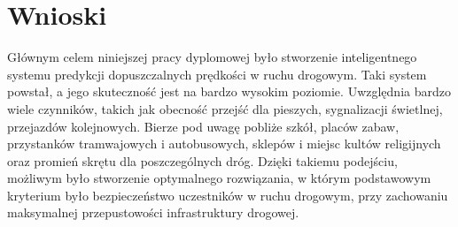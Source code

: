 \chapter{Wnioski}
\label{cha:wnioski}

Głównym celem niniejszej pracy dyplomowej było stworzenie inteligentnego systemu predykcji dopuszczalnych prędkości w ruchu drogowym. Taki system powstał, a jego skuteczność jest na bardzo wysokim poziomie. Uwzględnia bardzo wiele czynników, takich jak obecność przejść dla pieszych, sygnalizacji świetlnej, przejazdów kolejnowych. Bierze pod uwagę pobliże szkół, placów zabaw, przystanków tramwajowych i autobusowych, sklepów i miejsc kultów religijnych oraz promień skrętu dla poszczególnych dróg. Dzięki takiemu podejściu, możliwym było stworzenie optymalnego rozwiązania, w którym podstawowym kryterium było bezpieczeństwo uczestników w ruchu drogowym, przy zachowaniu maksymalnej przepustowości infrastruktury drogowej.
